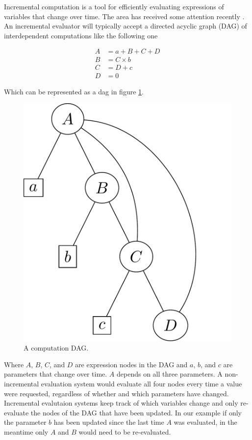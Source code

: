 Incremental computation is a tool for efficiently evaluating
expressions of variables that change over time. The area has received
some attention recently
\cite{bhatotiaIncoopMapReduceIncremental2011,hammerAdaptonComposableDemanddriven2014a}. An
incremental evaluator will typically accept a directed acyclic graph
(DAG) of interdependent computations like the following one

\begin{align*}
A &= a + B + C + D  \\
B &= C \times b \\
C & = D + c \\
D &= 0
\end{align*}

Which can be represented as a dag in figure
\ref{fig:example_antisthenis_dag}.

\begin{figure}[H]
\centering
\includegraphics[width=.9\linewidth]{./imgs/example_antisthenis_dag.pdf}
\caption{\label{fig:example_antisthenis_dag}A computation DAG.}
\end{figure}

Where \(A\), \(B\), \(C\), and \(D\) are expression nodes in the DAG
and \(a\), \(b\), and \(c\) are parameters that change over
time. \(A\) depends on all three parameters. A non-incremental
evaluation system would evaluate all four nodes every time a value
were requested, regardless of whether and which parameters have
changed. Incremental evalutaion systems keep track of which variables
change and only re-evaluate the nodes of the DAG that have been
updated. In our example if only the parameter \(b\) has been updated
since the last time \(A\) was evaluated, in the meantime only \(A\)
and \(B\) would need to be re-evaluated.

